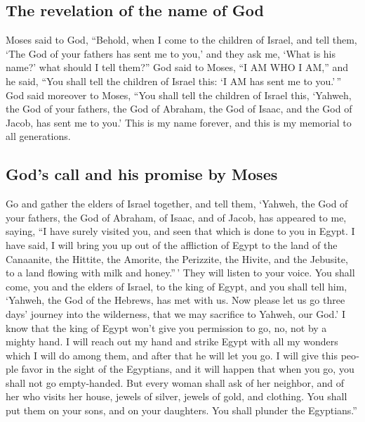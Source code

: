 \begin{paracol}{2}
\begin{otherlanguage}{english}
\hypertarget{the-revelation-of-the-name-of-god}{%
\subsection{The revelation of the name of
God}\label{the-revelation-of-the-name-of-god}}

 Moses said to God, ``Behold, when I come to the children
of Israel, and tell them, `The God of your fathers has sent me to you,'
and they ask me, `What is his name?' what should I tell them?''
 God said to Moses, ``I AM WHO I AM,'' and he said, ``You
shall tell the children of Israel this: `I AM has sent me to you.'\,''
 God said moreover to Moses, ``You shall tell the
children of Israel this, `Yahweh, the God of your fathers, the God of
Abraham, the God of Isaac, and the God of Jacob, has sent me to you.'
This is my name forever, and this is my memorial to all generations.

\hypertarget{gods-call-and-his-promise-by-moses}{%
\subsection{God's call and his promise by
Moses}\label{gods-call-and-his-promise-by-moses}}

 Go and gather the elders of Israel together, and tell
them, `Yahweh, the God of your fathers, the God of Abraham, of Isaac,
and of Jacob, has appeared to me, saying, ``I have surely visited you,
and seen that which is done to you in Egypt.  I have
said, I will bring you up out of the affliction of Egypt to the land of
the Canaanite, the Hittite, the Amorite, the Perizzite, the Hivite, and
the Jebusite, to a land flowing with milk and honey.''\,'
 They will listen to your voice. You shall come, you and
the elders of Israel, to the king of Egypt, and you shall tell him,
`Yahweh, the God of the Hebrews, has met with us. Now please let us go
three days' journey into the wilderness, that we may sacrifice to
Yahweh, our God.'  I know that the king of Egypt won't
give you permission to go, no, not by a mighty hand.  I
will reach out my hand and strike Egypt with all my wonders which I will
do among them, and after that he will let you go.  I will
give this people favor in the sight of the Egyptians, and it will happen
that when you go, you shall not go empty-handed.  But
every woman shall ask of her neighbor, and of her who visits her house,
jewels of silver, jewels of gold, and clothing. You shall put them on
your sons, and on your daughters. You shall plunder the Egyptians.''


\end{otherlanguage}
\end{paracol}
